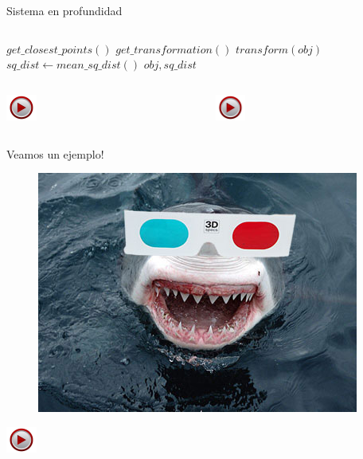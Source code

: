 \documentclass[]{beamer}
\newcommand{\video}[1]{
    \begin{center}
        \href{run:#1}{
            \includegraphics[width=1cm]{img/play.jpeg}
        }
    \end{center}
}
\begin{document}
\begin{frame}[fragile]{Sistema en profundidad}
\begin{columns}
\begin{column}{5cm}
{\begin{center}
                \end{center}
                \footnotesize
                \begin{algorithmic}
                    	\Loop
                    		\State $get\_closest\_points()$
                    		\State $get\_transformation()$
                    		\State $transform(obj)$
                    		\State $sq\_dist \gets mean\_sq\_dist()$
                    	\EndLoop
                        \State \Return $obj, sq\_dist$
                    \EndFunction
                \end{algorithmic}
                \normalsize

                \begin{columns}
                    \begin{column}{2cm}
                        \video{videos/taza_pre_icp.ogv}
                    \end{column}
                    \begin{column}{2cm}
                        \video{videos/taza_post_icp.ogv}
                    \end{column}
                \end{columns}
            }
        \end{column}

    \end{columns}

\end{frame}


\begin{frame}[t]{Veamos un ejemplo!}
    \begin{figure}[t]
        \centering
        \includegraphics[scale=0.5]{img/anteojos/poner_anteojos_3d_7.jpg}
    \end{figure}
    \video{videos/seguimiento_depth.ogv}
\end{frame}
\end{document}

